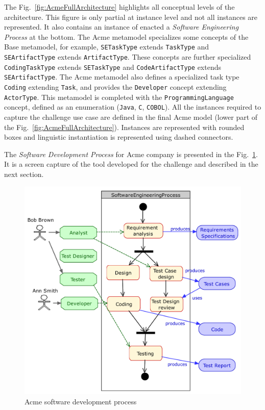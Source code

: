 The Fig.~\ref{fig:AcmeFullArchitecture} highlights all conceptual levels of the
architecture. This figure is only partial at instance level and not all
instances are represented. It also contains an instance of enacted a
\textit{Software Engineering Process} at the bottom. The Acme metamodel
specializes some concepts of the Base metamodel, for example,
\texttt{SETaskType} extends \texttt{TaskType} and \texttt{SEArtifactType}
extends \texttt{ArtifactType}. These concepts are further specialized
\texttt{CodingTaskType} extends \texttt{SETaskType} and
\texttt{CodeArtifactType} extends \texttt{SEArtifactType}.  The Acme metamodel
also defines a specialized task type \texttt{Coding} extending \texttt{Task},
and provides the \texttt{Developer} concept extending \texttt{ActorType}. This
metamodel is completed with the \texttt{ProgrammingLanguage} concept, defined
as an enumeration (\texttt{Java}, \texttt{C}, \texttt{COBOL}). All the
instances required to capture the challenge use case are defined in the final
Acme model (lower part of the Fig.~\ref{fig:AcmeFullArchitecture}). Instances
are represented with rounded boxes and linguistic instantiation is represented
using dashed connectors.

The \textit{Software Development Process} for Acme company is presented in the
Fig.~\ref{fig:AcmeSoftwareDevelopmentProcess}. It is a screen capture of the
tool developed for the challenge and described in the next section.

\begin{figure}[t]
 \centering
    \includegraphics[width=1.0 \columnwidth]{Figures/SoftwareEngineeringProcessCroped.pdf}
     \caption{Acme software development process}
    \label{fig:AcmeSoftwareDevelopmentProcess}
\end{figure}

